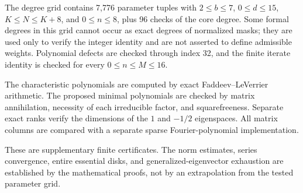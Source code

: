\documentclass[11pt,a4paper]{article}
\numberwithin{equation}{section}
\theoremstyle{definition}
\theoremstyle{remark}
\begin{document}
The degree grid contains 7,776 parameter tuples with
$2\le b\le7$, $0\le d\le15$, $K\le N\le K+8$, and $0\le n\le8$,
plus 96 checks of the core degree. Some formal degrees in this grid
cannot occur as exact degrees of normalized masks; they are used only
to verify the integer identity and are not asserted to define admissible
weights. Polynomial defects are checked through index 32, and the
finite iterate identity is checked for every $0\le n\le M\le16$.

The characteristic polynomials are computed by exact
Faddeev--LeVerrier arithmetic. The proposed minimal polynomials are
checked by matrix annihilation, necessity of each irreducible factor,
and squarefreeness. Separate exact ranks verify the dimensions of the
$1$ and $-1/2$ eigenspaces. All matrix columns are compared with a
separate sparse Fourier-polynomial implementation.

These are supplementary finite certificates. The norm estimates,
series convergence, entire essential disks, and generalized-eigenvector
exhaustion are established by the mathematical proofs, not by an
extrapolation from the tested parameter grid.
\end{document}
